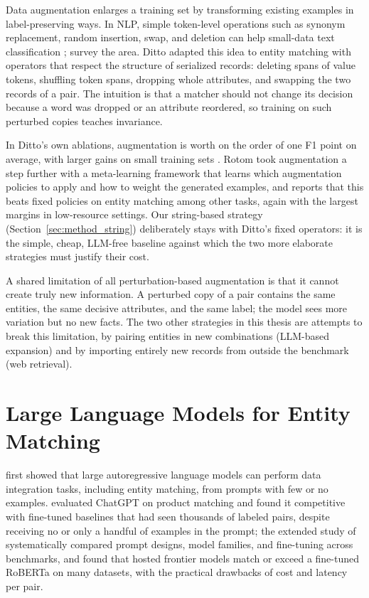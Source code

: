 \documentclass[a4paper,oneside,bibliography=totoc]{scrbook}
\begin{document}
Data augmentation enlarges a training set by transforming existing examples in label-preserving ways. In NLP, simple token-level operations such as synonym replacement, random insertion, swap, and deletion can help small-data text classification \cite{wei2019eda}; \citet{shorten2021text} survey the area. Ditto \cite{li2020deep} adapted this idea to entity matching with operators that respect the structure of serialized records: deleting spans of value tokens, shuffling token spans, dropping whole attributes, and swapping the two records of a pair. The intuition is that a matcher should not change its decision because a word was dropped or an attribute reordered, so training on such perturbed copies teaches invariance.

In Ditto's own ablations, augmentation is worth on the order of one F1 point on average, with larger gains on small training sets \cite{li2020deep}. Rotom \cite{miao2021rotom} took augmentation a step further with a meta-learning framework that learns which augmentation policies to apply and how to weight the generated examples, and reports that this beats fixed policies on entity matching among other tasks, again with the largest margins in low-resource settings. Our string-based strategy (Section~\ref{sec:method_string}) deliberately stays with Ditto's fixed operators: it is the simple, cheap, LLM-free baseline against which the two more elaborate strategies must justify their cost.

A shared limitation of all perturbation-based augmentation is that it cannot create truly new information. A perturbed copy of a pair contains the same entities, the same decisive attributes, and the same label; the model sees more variation but no new facts. The two other strategies in this thesis are attempts to break this limitation, by pairing entities in new combinations (LLM-based expansion) and by importing entirely new records from outside the benchmark (web retrieval).

\section{Large Language Models for Entity Matching}
\label{sec:rw_llm}

\citet{narayan2022can} first showed that large autoregressive language models can perform data integration tasks, including entity matching, from prompts with few or no examples. \citet{peeters2023using} evaluated ChatGPT on product matching and found it competitive with fine-tuned baselines that had seen thousands of labeled pairs, despite receiving no or only a handful of examples in the prompt; the extended study of \citet{peeters2025entity} systematically compared prompt designs, model families, and fine-tuning across benchmarks, and found that hosted frontier models match or exceed a fine-tuned RoBERTa on many datasets, with the practical drawbacks of cost and latency per pair.
\end{document}
